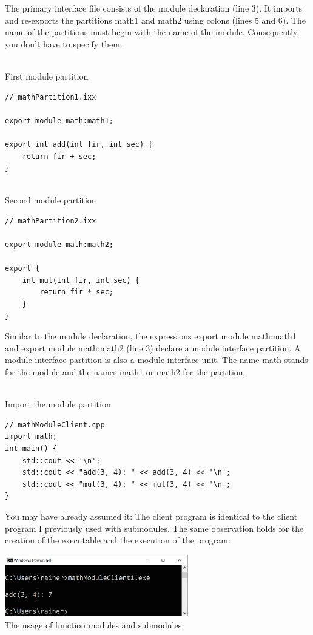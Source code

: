 The primary interface file consists of the module declaration (line 3). It imports and re-exports the partitions math1 and math2 using colons (lines 5 and 6). The name of the partitions must begin with the name of the module. Consequently, you don’t have to specify them.

\hspace*{\fill} \\ %
\noindent
First module partition
\begin{lstlisting}[style=styleCXX]
// mathPartition1.ixx

export module math:math1;

export int add(int fir, int sec) {
	return fir + sec;
}
\end{lstlisting}

\hspace*{\fill} \\ %
\noindent
Second module partition
\begin{lstlisting}[style=styleCXX]
// mathPartition2.ixx

export module math:math2;

export {
	int mul(int fir, int sec) {
		return fir * sec;
	}
}
\end{lstlisting}

Similar to the module declaration, the expressions export module math:math1 and export module math:math2 (line 3) declare a module interface partition. A module interface partition is also a module interface unit. The name math stands for the module and the names math1 or math2 for the partition.

\hspace*{\fill} \\ %
\noindent
Import the module partition
\begin{lstlisting}[style=styleCXX]
// mathModuleClient.cpp
import math;
int main() {
	std::cout << '\n';
	std::cout << "add(3, 4): " << add(3, 4) << '\n';
	std::cout << "mul(3, 4): " << mul(3, 4) << '\n';
}
\end{lstlisting}

You may have already assumed it: The client program is identical to the client program I previously used with submodules. The same observation holds for the creation of the executable and the execution of the program:

\begin{center}
\includegraphics[width=0.6\textwidth]{content/3/chapter4/images/23.png}\\
The usage of function modules and submodules
\end{center}

